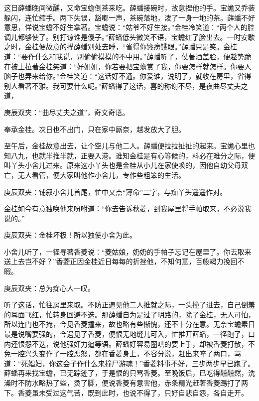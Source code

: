 \begin{parag}
    这日薛蟠晚间微醺，又命宝蟾倒茶来吃。薛蟠接碗时，故意捏他的手。宝蟾又乔装躲闪，连忙缩手。两下失误，豁啷一声，茶碗落地，泼了一身一地的茶。薛蟠不好意思，佯说宝蟾不好生拿著。宝蟾说：“姑爷不好生接。”金桂冷笑道：“两个人的腔调儿都够使了。别打谅谁是傻子。”薛蟠低头微笑不语，宝蟾红了脸出去。一时安歇之时，金桂便故意的撵薛蟠别处去睡，“省得你馋痨饿眼。”薛蟠只是笑。金桂道：“要作什么和我说，别偷偷摸摸的不中用。”薛蟠听了，仗著酒盖脸，便趁势跪在被上拉著金桂笑道：“好姐姐，你若要把宝蟾赏了我，你要怎样就怎样。你要人脑子也弄来给你。”金桂笑道：“这话好不通。你爱谁，说明了，就收在房里，省得别人看著不雅。我可要什么呢。”薛蟠得了这话，喜的称谢不尽，是夜曲尽丈夫之道，\begin{note}庚辰双夹：“曲尽丈夫之道”，奇文奇语。\end{note}奉承金桂。次日也不出门，只在家中厮奈，越发放大了胆。
\end{parag}


\begin{parag}
    至午后，金桂故意出去，让个空儿与他二人。薛蟠便拉拉扯扯的起来。宝蟾心里也知八九，也就半推半就，正要入港。谁知金桂是有心等候的，料必在难分之际，便叫丫头小舍儿过来。原来这小丫头也是金桂从小儿在家使唤的，因他自幼父母双亡，无人看管，便大家叫他作小舍儿，专作些粗笨的生活。\begin{note}庚辰双夹：铺叙小舍儿首尾，忙中又点“薄命”二字，与痴丫头遥遥作对。\end{note}金桂如今有意独唤他来吩咐道：“你去告诉秋菱，到我屋里将手帕取来，不必说我说的。”\begin{note}庚辰双夹：金桂坏极！所以独使小舍为此。\end{note}小舍儿听了，一径寻著香菱说：“菱姑娘，奶奶的手帕子忘记在屋里了。你去取来送上去岂不好？”香菱正因金桂近日每每的折挫他，不知何意，百般竭力挽回不暇。\begin{note}庚辰双夹：总为痴心人一叹。\end{note}听了这话，忙往房里来取。不防正遇见他二人推就之际，一头撞了进去，自己倒羞的耳面飞红，忙转身回避不迭。那薛蟠自为是过了明路的，除了金桂，无人可怕，所以连门也不掩，今见香菱撞来，故也略有些惭愧，还不十分在意。无奈宝蟾素日最是说嘴要强的，今遇见了香菱，便恨无地缝儿可入，忙推开薛蟠，一径跑了，口内还恨怨不迭，说他强奸力逼等语。薛蟠好容易圈哄的要上手，却被香菱打散，不免一腔兴头变作了一腔恶怒，都在香菱身上，不容分说，赶出来啐了两口，骂道：“死娼妇，你这会子作什么来撞尸游魂！”香菱料事不好，三步两步早已跑了。薛蟠再来找宝蟾，已无踪迹了，于是恨的只骂香菱。至晚饭后，已吃得醺醺然，洗澡时不防水略热了些，烫了脚，便说香菱有意害他，赤条精光赶著香菱踢打了两下。香菱虽未受过这气苦，既到此时，也说不得了，只好自悲自怨，各自走开。
\end{parag}


